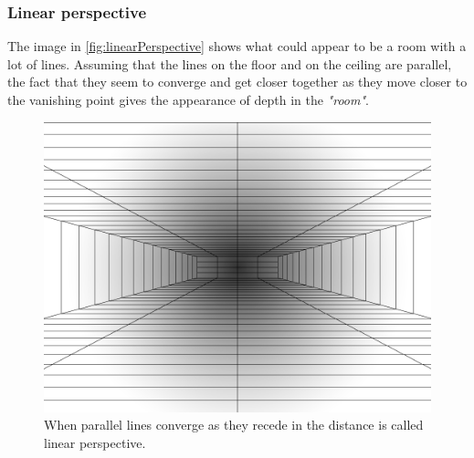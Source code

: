 \subsubsection{Linear perspective}
The image in \autoref{fig:linearPerspective} shows what could appear to be a room with a lot of lines. Assuming that the lines on the floor and on the ceiling are parallel, the fact that they seem to converge and get closer together as they move closer to the vanishing point gives the appearance of depth in the \textit{"room"}\citep{sensationPerception}.
\begin{figure}[H]
	\centering
	\includegraphics[width=1\linewidth]{figure/Analysis/linearPerspective.png}
	\caption{When parallel lines converge as they recede in the distance is called linear perspective.}
	\label{fig:linearPerspective}
\end{figure}

